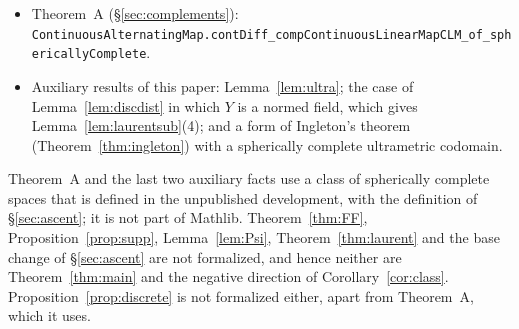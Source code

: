 \documentclass[11pt]{amsart}
\theoremstyle{definition}
\theoremstyle{remark}
\numberwithin{equation}{section}
\begin{document}
\begin{itemize}
\texttt{ContinuousAlternatingMap.\allowbreak{}contDiff\_\allowbreak{}compContinuousLinearMapCLM\_\allowbreak{}of\_\allowbreak{}factorial\_\allowbreak{}ne\_\allowbreak{}zero},
under the hypothesis
$((\mathrm{card}\ \iota)!:K)\ne0$, for all normed $E,E',F$.
\item Theorem~A (\S\ref{sec:complements}):
\texttt{ContinuousAlternatingMap.\allowbreak{}contDiff\_\allowbreak{}compContinuousLinearMapCLM\_\allowbreak{}of\_\allowbreak{}sphericallyComplete}.
\item Auxiliary results of this paper: Lemma~\ref{lem:ultra}; the case of Lemma~\ref{lem:discdist} in which $Y$
is a normed field, which gives Lemma~\ref{lem:laurentsub}(4); and a form of Ingleton's theorem
(Theorem~\ref{thm:ingleton}) with a spherically complete ultrametric codomain.
\end{itemize}
Theorem~A and the last two auxiliary facts use a class of spherically complete spaces that is defined in the
unpublished development, with the definition of \S\ref{sec:ascent}; it is not part of Mathlib.
Theorem~\ref{thm:FF}, Proposition~\ref{prop:supp}, Lemma~\ref{lem:Psi}, Theorem~\ref{thm:laurent} and the base change of
\S\ref{sec:ascent} are not formalized, and hence neither are Theorem~\ref{thm:main} and the negative direction of
Corollary~\ref{cor:class}. Proposition~\ref{prop:discrete} is not formalized either, apart from Theorem~A, which it uses.
\end{document}
